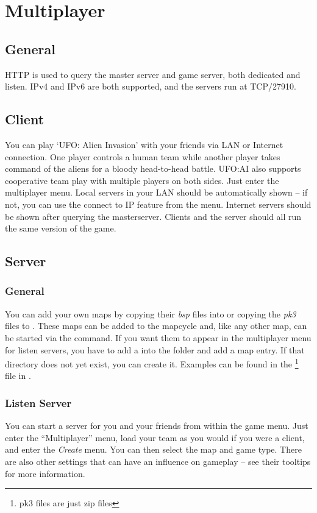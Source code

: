 \section{Multiplayer}
\subsection{General}
HTTP is used to query the master server and game server, both dedicated and listen.  IPv4 and IPv6 are both supported, and the servers run at TCP/27910.

\subsection{Client}
You can play `UFO: Alien Invasion' with your friends via LAN or Internet connection. One player controls a human team while another player takes command of the aliens for a bloody head-to-head battle. UFO:AI also supports cooperative team play with multiple players on both sides. Just enter the multiplayer menu. Local servers in your LAN should be automatically shown -- if not, you can use the connect to IP feature from the menu. Internet servers should be shown after querying the masterserver. Clients and the server should all run the same version of the game.

\subsection{Server}

\subsubsection{General}
You can add your own maps by copying their \emph{bsp} files into  or copying the \emph{pk3} files to . These maps can be added to the mapcycle and, like any other map, can be started via the  command. If you want them to appear in the multiplayer menu for listen servers, you have to add a  into the  folder and add a map entry. If that directory does not yet exist, you can create it.
Examples can be found in the \footnote{pk3 files are just zip files} file in .

\subsubsection{Listen Server}
You can start a server for you and your friends from within the game menu. Just enter the ``Multiplayer'' menu, load your team as you would if you were a client, and enter the \emph{Create} menu. You can then select the map and game type. There are also other settings that can have an influence on gameplay -- see their tooltips for more information.

